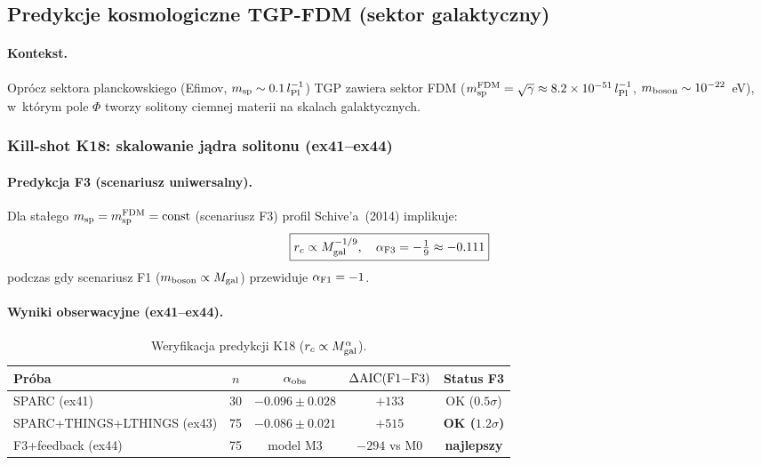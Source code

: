 \subsection{Predykcje kosmologiczne TGP-FDM (sektor galaktyczny)}

\paragraph{Kontekst.}
Oprócz sektora planckowskiego (Efimov, $m_{\rm sp} \sim 0.1\,l_{\rm Pl}^{-1}$)
TGP zawiera sektor FDM ($m_{\rm sp}^{\rm FDM} = \sqrt{\gamma}
\approx 8.2\times10^{-51}\,l_{\rm Pl}^{-1}$, $m_{\rm boson} \sim 10^{-22}$~eV),
w~którym pole $\Phi$ tworzy solitony ciemnej materii na skalach galaktycznych.

\subsubsection{Kill-shot K18: skalowanie jądra solitonu (ex41--ex44)}

\paragraph{Predykcja F3 (scenariusz uniwersalny).}
Dla stałego $m_{\rm sp} = m_{\rm sp}^{\rm FDM} = \mathrm{const}$ (scenariusz
F3) profil Schive'a~(2014) implikuje:
\begin{equation}\label{eq:k18-prediction}
  \boxed{r_c \propto M_{\rm gal}^{-1/9},
  \quad \alpha_{\rm F3} = -\tfrac{1}{9} \approx -0.111}
\end{equation}
podczas gdy scenariusz F1 ($m_{\rm boson} \propto M_{\rm gal}$) przewiduje
$\alpha_{\rm F1} = -1$.

\paragraph{Wyniki obserwacyjne (ex41--ex44).}
\begin{table}[h]
\centering
\caption{Weryfikacja predykcji K18 ($r_c \propto M_{\rm gal}^{\alpha}$).}
\label{tab:k18}
\begin{tabular}{lcccc}
\toprule
Próba & $n$ & $\alpha_{\rm obs}$ & $\Delta{\rm AIC}({\rm F1{-}F3})$
  & Status F3 \\
\midrule
SPARC (ex41) & 30 & $-0.096\pm0.028$ & $+133$ & OK ($0.5\sigma$) \\
SPARC+THINGS+LTHINGS (ex43) & 75 & $-0.086\pm0.021$ & $+515$
  & \textbf{OK ($1.2\sigma$)} \\
F3+feedback (ex44) & 75 & model M3 & $-294$ vs M0 & \textbf{najlepszy} \\
\bottomrule
\end{tabular}
\end{table}

